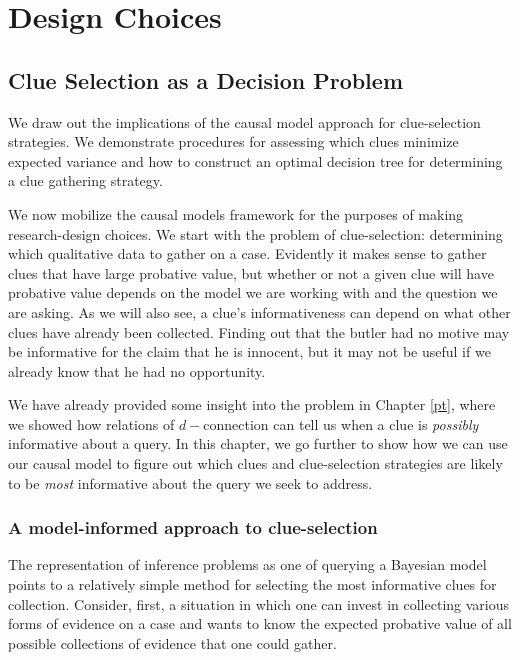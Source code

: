 \documentclass[
  12pt,
]{book}
\newenvironment{headerbox}{
  \definecolor{shadecolor}{rgb}{0.8, 0.8, 0.8}  %
  \color{black}
  \begin{shaded}}{\end{shaded}}
\begin{document}
\hypertarget{part-design-choices}{%
\part{Design Choices}\label{part-design-choices}}

\hypertarget{clue}{%
\chapter{Clue Selection as a Decision Problem}\label{clue}}

\begin{headerbox}
We draw out the implications of the causal model approach for clue-selection strategies. We demonstrate procedures for assessing which clues minimize expected variance and how to construct an optimal decision tree for determining a clue gathering strategy.

\end{headerbox}

We now mobilize the causal models framework for the purposes of making research-design choices. We start with the problem of clue-selection: determining which qualitative data to gather on a case. Evidently it makes sense to gather clues that have large probative value, but whether or not a given clue will have probative value depends on the model we are working with and the question we are asking. As we will also see, a clue's informativeness can depend on what other clues have already been collected. Finding out that the butler had no motive may be informative for the claim that he is innocent, but it may not be useful if we already know that he had no opportunity.

We have already provided some insight into the problem in Chapter \ref{pt}, where we showed how relations of \(d-\)connection can tell us when a clue is \emph{possibly} informative about a query. In this chapter, we go further to show how we can use our causal model to figure out which clues and clue-selection strategies are likely to be \emph{most} informative about the query we seek to address.

\hypertarget{a-model-informed-approach-to-clue-selection}{%
\section{A model-informed approach to clue-selection}\label{a-model-informed-approach-to-clue-selection}}

The representation of inference problems as one of querying a Bayesian model points to a relatively simple method for selecting the most informative clues for collection. Consider, first, a situation in which one can invest in collecting various forms of evidence on a case and wants to know the expected probative value of all possible collections of evidence that one could gather.
\end{document}
